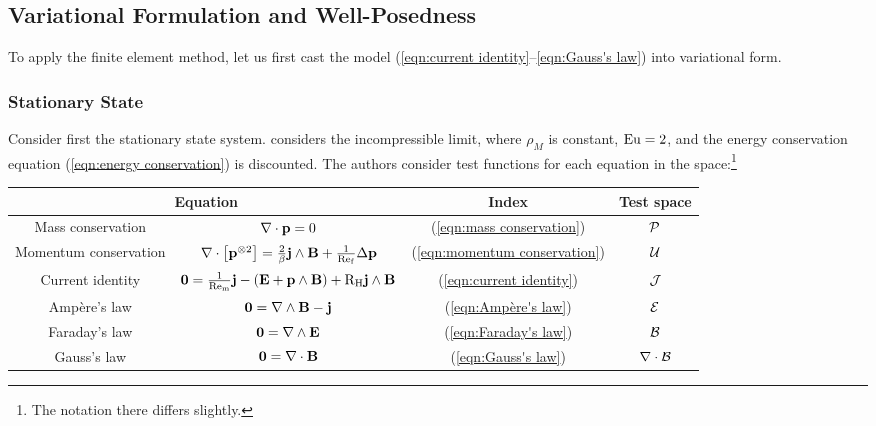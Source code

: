 \subsection{Variational Formulation and Well-Posedness}
    
    To apply the finite element method, let us first cast the model (\ref{eqn:current identity}–\ref{eqn:Gauss's law}) into variational form.
    
    \subsubsection*{Stationary State}
        Consider first the stationary state system. \cite{LHF22} considers the incompressible limit, where $\rho_{M}$ is constant, $\mathrm{Eu}  =  2$, and the energy conservation equation (\ref{eqn:energy conservation}) is discounted. The authors consider test functions for each equation in the space:\footnote{The notation there differs slightly.}
        \begin{center}\begin{tabular}{ c c c | c }
            \multicolumn{2}{c}{Equation}  &  Index  &  Test space  \\
            \hline\hline
            Mass conservation  &  $\nabla\cdot\mathbf{p}  =  0$  &  (\ref{eqn:mass conservation})  &  $\mathcal{P}$  \\
            Momentum conservation  &  $\nabla\cdot\left[\mathbf{p}^{\otimes 2}\right]  =  \frac{2}{\beta}\mathbf{j}\wedge\mathbf{B} + \frac{1}{\mathrm{Re}_{\mathrm{f}}}\Delta\mathbf{p}$  &  (\ref{eqn:momentum conservation})  &  $\mathcal{U}$  \\
            \hline
            Current identity  &  $\mathbf{0}  =  \frac{1}{\mathrm{Re}_{\mathrm{m}}}\mathbf{j} - (\mathbf{E} + \mathbf{p}\wedge\mathbf{B}) + \mathrm{R}_{\mathrm{H}}\mathbf{j}\wedge\mathbf{B}$  &  (\ref{eqn:current identity})  &  $\mathcal{J}$  \\
            \hline
            Ampère's law  &  $\mathbf{0}  =  \nabla\wedge\mathbf{B} - \mathbf{j}$  &  (\ref{eqn:Ampère's law})  &  $\mathcal{E}$  \\
            Faraday's law  &  $\mathbf{0}  =  \nabla\wedge\mathbf{E}$  &  (\ref{eqn:Faraday's law})  &  $\mathcal{B}$  \\
            Gauss's law  &  $\mathbf{0}  =  \nabla\cdot\mathbf{B}$  &  (\ref{eqn:Gauss's law})  &  $\nabla\cdot\mathcal{B}$  \\
        \end{tabular}\end{center}
    